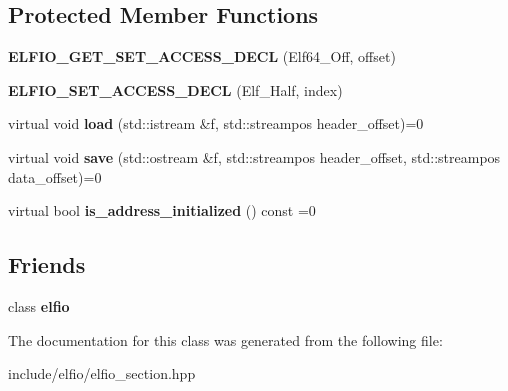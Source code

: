 \subsection*{Protected Member Functions}
\begin{DoxyCompactItemize}
\item 
{\bfseries E\+L\+F\+I\+O\+\_\+\+G\+E\+T\+\_\+\+S\+E\+T\+\_\+\+A\+C\+C\+E\+S\+S\+\_\+\+D\+E\+CL} (Elf64\+\_\+\+Off, offset)\hypertarget{class_e_l_f_i_o_1_1section_a1adb0bfa65628781636e1125025720dd}{}\label{class_e_l_f_i_o_1_1section_a1adb0bfa65628781636e1125025720dd}

\item 
{\bfseries E\+L\+F\+I\+O\+\_\+\+S\+E\+T\+\_\+\+A\+C\+C\+E\+S\+S\+\_\+\+D\+E\+CL} (Elf\+\_\+\+Half, index)\hypertarget{class_e_l_f_i_o_1_1section_a7d8e5f9edaaadc886b1ba782eb309c88}{}\label{class_e_l_f_i_o_1_1section_a7d8e5f9edaaadc886b1ba782eb309c88}

\item 
virtual void {\bfseries load} (std\+::istream \&f, std\+::streampos header\+\_\+offset)=0\hypertarget{class_e_l_f_i_o_1_1section_a6b85f1b2b75aca23446772c146052e54}{}\label{class_e_l_f_i_o_1_1section_a6b85f1b2b75aca23446772c146052e54}

\item 
virtual void {\bfseries save} (std\+::ostream \&f, std\+::streampos header\+\_\+offset, std\+::streampos data\+\_\+offset)=0\hypertarget{class_e_l_f_i_o_1_1section_a957d8a474005ba0177fae12a8b019d8a}{}\label{class_e_l_f_i_o_1_1section_a957d8a474005ba0177fae12a8b019d8a}

\item 
virtual bool {\bfseries is\+\_\+address\+\_\+initialized} () const =0\hypertarget{class_e_l_f_i_o_1_1section_ae1c5dda5638cb9baa60775ffc30bff66}{}\label{class_e_l_f_i_o_1_1section_ae1c5dda5638cb9baa60775ffc30bff66}

\end{DoxyCompactItemize}
\subsection*{Friends}
\begin{DoxyCompactItemize}
\item 
class {\bfseries elfio}\hypertarget{class_e_l_f_i_o_1_1section_a6c96e3a7c68ba681cd79b5e267538d3d}{}\label{class_e_l_f_i_o_1_1section_a6c96e3a7c68ba681cd79b5e267538d3d}

\end{DoxyCompactItemize}


The documentation for this class was generated from the following file\+:\begin{DoxyCompactItemize}
\item 
include/elfio/elfio\+\_\+section.\+hpp\end{DoxyCompactItemize}
